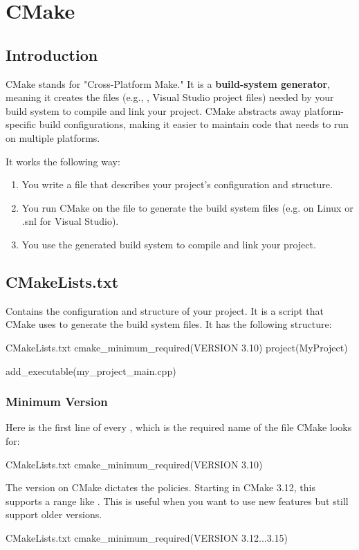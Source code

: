 \chapter{CMake}

\section{Introduction}

CMake stands for "Cross-Platform Make." It is a \textbf{build-system generator}, meaning it creates the files (e.g., , Visual Studio project files) needed by your build system to compile and link your project.
CMake abstracts away platform-specific build configurations, making it easier to maintain code that needs to run on multiple platforms.

It works the following way:
\begin{enumerate}
    \item You write a  file that describes your project's configuration and structure.
    \item You run CMake on the  file to generate the build system files (e.g.  on Linux or .snl for Visual Studio).
    \item You use the generated build system to compile and link your project.
\end{enumerate}

\section{CMakeLists.txt}

Contains the configuration and structure of your project. It is a script that CMake uses to generate the build system files.
It has the following structure:

\begin{neonlisting}[language=C++]{CMakeLists.txt}
    cmake_minimum_required(VERSION 3.10) 
    project(MyProject)  

    add_executable(my_project_main.cpp) 
    \end{neonlisting}

\subsection{Minimum Version}

Here is the first line of every , which is the required name of the file CMake looks for:
\begin{neonlisting}{CMakeLists.txt}
    cmake_minimum_required(VERSION 3.10)
\end{neonlisting}
The version on CMake dictates the policies. Starting in CMake 3.12, this supports
a range like . This is useful when you want to use new features but still support older versions.
\begin{neonlisting}{CMakeLists.txt}
    cmake_minimum_required(VERSION 3.12...3.15)
\end{neonlisting}

